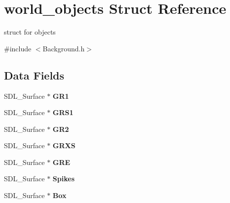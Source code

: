 \hypertarget{structworld__objects}{}\section{world\+\_\+objects Struct Reference}
\label{structworld__objects}


struct for objects  




{\ttfamily \#include $<$Background.\+h$>$}

\subsection*{Data Fields}
\begin{DoxyCompactItemize}
\item 
\mbox{\label{structworld__objects_ac22df17526b9ba5629607d8a9c5d1b9c}} 
S\+D\+L\+\_\+\+Surface $\ast$ {\bfseries G\+R1}
\item 
\mbox{\label{structworld__objects_a0c7f68b7904105d48f49f479f590a0ac}} 
S\+D\+L\+\_\+\+Surface $\ast$ {\bfseries G\+R\+S1}
\item 
\mbox{\label{structworld__objects_abc18590f94986df684d10bb0048062e9}} 
S\+D\+L\+\_\+\+Surface $\ast$ {\bfseries G\+R2}
\item 
\mbox{\label{structworld__objects_a1a3bdd9fdf413501455a0ac9ac57ac0a}} 
S\+D\+L\+\_\+\+Surface $\ast$ {\bfseries G\+R\+XS}
\item 
\mbox{\label{structworld__objects_a36e75dbfc075ad46a335eadd06e73e90}} 
S\+D\+L\+\_\+\+Surface $\ast$ {\bfseries G\+RE}
\item 
\mbox{\label{structworld__objects_ade4f1a3bc8aace5a73ab736923d0bf80}} 
S\+D\+L\+\_\+\+Surface $\ast$ {\bfseries Spikes}
\item 
\mbox{\label{structworld__objects_a1300ec254a3fa80db4c23b77bf31a57c}} 
S\+D\+L\+\_\+\+Surface $\ast$ {\bfseries Box}
\item 
\mbox{\label{structworld__objects_ada8e7fb193d1df5d591d0e72e158a5ae}} 

\end{DoxyCompactItemize}
